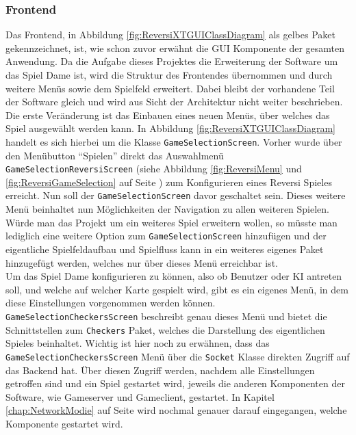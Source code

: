 \documentclass[12pt,a4paper,bibliography=totocnumbered,listof=totocnumbered]{article}
\begin{document}
\subsubsection{Frontend}
Das Frontend, in Abbildung \ref{fig:ReversiXTGUIClassDiagram} als gelbes Paket gekennzeichnet, ist, wie schon zuvor erwähnt die
\ac{GUI} Komponente der gesamten Anwendung. Da die Aufgabe dieses Projektes die Erweiterung der Software um das Spiel Dame ist, 
wird die Struktur des Frontendes übernommen und durch weitere Menüs sowie dem Spielfeld erweitert. Dabei bleibt der vorhandene Teil der Software gleich 
und wird aus Sicht der Architektur nicht weiter beschrieben. 
\\
Die erste Veränderung ist das Einbauen eines neuen Menüs, über welches das Spiel ausgewählt werden kann. In Abbildung \ref{fig:ReversiXTGUIClassDiagram} 
handelt es sich hierbei um die Klasse \texttt{GameSelectionScreen}. Vorher wurde über den Menübutton ``Spielen'' direkt das Auswahlmenü \\ 
\texttt{GameSelectionReversiScreen}
(siehe Abbildung \ref{fig:ReversiMenu} und \ref{fig:ReversiGameSelection} auf Seite \pageref{fig:ReversiMenu}) zum Konfigurieren eines Reversi Spieles erreicht. 
Nun soll der \texttt{GameSelectionScreen} davor geschaltet sein. Dieses weitere Menü beinhaltet nun Möglichkeiten der Navigation zu allen weiteren Spielen.
Würde man das Projekt um ein weiteres Spiel erweitern wollen, so müsste man lediglich eine weitere Option zum \texttt{GameSelectionScreen} hinzufügen 
und der eigentliche Spielfeldaufbau und Spielfluss kann in ein weiteres eigenes Paket hinzugefügt werden, welches nur über dieses Menü erreichbar ist.
\\
Um das Spiel Dame konfigurieren zu können, also ob Benutzer oder \ac{KI} antreten soll, und welche auf welcher Karte gespielt wird, gibt es ein eigenes Menü, 
in dem diese Einstellungen vorgenommen werden können. \texttt{GameSelectionCheckersScreen} beschreibt genau dieses Menü und bietet die Schnittstellen 
zum \texttt{Checkers} Paket, welches die Darstellung des eigentlichen Spieles beinhaltet. Wichtig ist hier noch zu erwähnen, dass das \texttt{GameSelectionCheckersScreen}
Menü über die \texttt{Socket} Klasse direkten Zugriff auf das Backend hat. Über diesen Zugriff werden, nachdem alle Einstellungen getroffen sind und ein Spiel
gestartet wird, jeweils die anderen Komponenten der Software, wie Gameserver und Gameclient, gestartet. In Kapitel \ref{chap:NetworkModie} auf Seite \pageref{chap:NetworkModie} 
wird nochmal genauer darauf eingegangen, welche Komponente gestartet wird.
\end{document}
